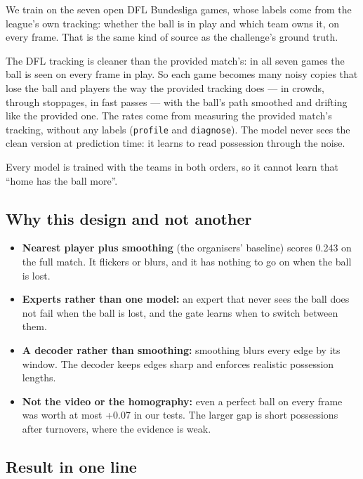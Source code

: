 \documentclass[10pt,a4paper]{article}
\begin{document}
We train on the seven open DFL Bundesliga games, whose labels come from the league's own
tracking: whether the ball is in play and which team owns it, on every frame. That is the same kind of source as the challenge's ground truth.


The DFL tracking is cleaner than the provided match's: in all seven games the ball is seen on
every frame in play. So each game becomes many noisy copies that lose the ball and players the way the provided tracking does — in crowds, through stoppages, in fast passes — with the ball's path smoothed and drifting like the provided one. The rates come from measuring the provided match's tracking, without any labels (\texttt{profile} and \texttt{diagnose}). The model never sees the clean version at prediction time: it learns to read possession through the noise.


Every model is trained with the teams in both orders, so it cannot learn that ``home has the ball more''.


\subsection*{Why this design and not another}


\begin{itemize}\setlength{\itemsep}{2pt}

\item \textbf{Nearest player plus smoothing} (the organisers' baseline) scores 0.243 on the full match. It
  flickers or blurs, and it has nothing to go on when the ball is lost.

\item \textbf{Experts rather than one model:} an expert that never sees the ball does not fail when the
  ball is lost, and the gate learns when to switch between them.

\item \textbf{A decoder rather than smoothing:} smoothing blurs every edge by its window. The decoder keeps
  edges sharp and enforces realistic possession lengths.

\item \textbf{Not the video or the homography:} even a perfect ball on every frame was worth at most +0.07
  in our tests. The larger gap is short possessions after turnovers, where the evidence is weak.

\end{itemize}


\subsection*{Result in one line}
\end{document}
